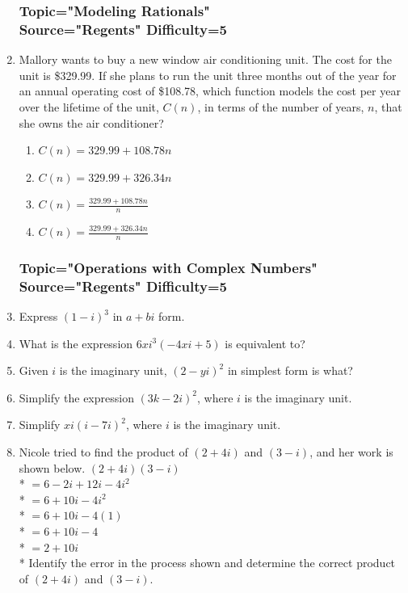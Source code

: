 \documentclass[12pt, oneside]{article}
\begin{document}
\begin{enumerate}
\subsubsection*{Topic="Modeling Rationals"\\
Source="Regents" 
Difficulty=5}

\item Mallory wants to buy a new window air conditioning unit. The cost for the unit is \$329.99. If she plans to run the unit three months out of the year for an annual operating cost of \$108.78, which function models the cost per year over the lifetime of the unit, $C(n)$, in terms of the number of years, $n$, that she owns the air conditioner?
\begin{enumerate}
    \item $C(n)=329.99+108.78n$
    \item $C(n)=329.99+326.34n$
    \item $\displaystyle C(n)=\frac{329.99+108.78n}{n}$
    \item $\displaystyle C(n)=\frac{329.99+326.34n}{n}$
\end{enumerate} %

\subsubsection*{Topic="Operations with Complex Numbers"\\
Source="Regents" 
Difficulty=5}

\item Express $(1-i)^3$ in $a+bi$ form. %

\item What is the expression $6xi^3(-4xi+5)$ is equivalent to?  %

\item Given $i$ is the imaginary unit, $(2-yi)^2$ in simplest form is what? %

\item Simplify the expression $(3k - 2i)^2$, where $i$ is the imaginary unit. %


\item Simplify $xi(i - 7i)^2$, where $i$ is the imaginary unit. %

\item Nicole tried to find the product of $(2+ 4i)$ and $(3 - i)$, and her work is shown below.
$(2 + 4i)(3 - i)$\\*
$=6 - 2i + 12i - 4i^2$\\*
$=6 + 10i - 4i^2$\\*
$=6 + 10i - 4(1)$\\*
$=6 + 10i - 4$\\*
$=2 + 10i$\\*
Identify the error in the process shown and determine the correct product of $(2+ 4i)$ and $(3 - i)$.%


\end{enumerate}
\end{document}
